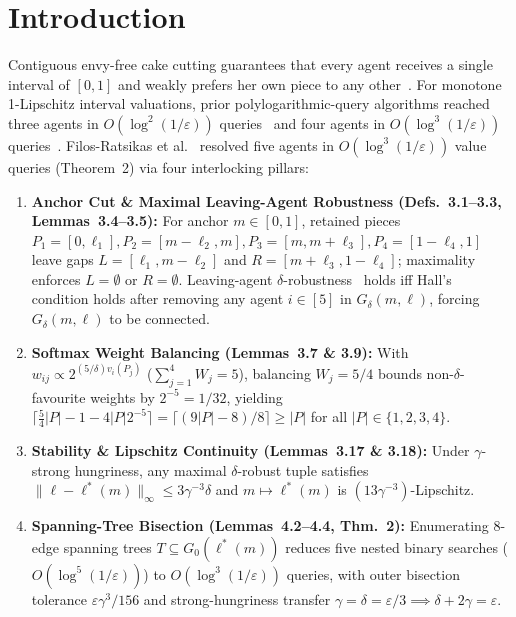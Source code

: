 \documentclass[10pt,twocolumn]{article}
\newcommand{\ellv}{\boldsymbol{\ell}}
\begin{document}
\section{Introduction}\label{sec:intro}
Contiguous envy-free cake cutting guarantees that every agent receives a single interval of $[0, 1]$ and weakly prefers her own piece to any other~\cite{stromquist1980cut,su1999rental}. For monotone 1-Lipschitz interval valuations, prior polylogarithmic-query algorithms reached three agents in $O(\log^2(1/\varepsilon))$ queries~\cite{deng2012algorithmic} and four agents in $O(\log^3(1/\varepsilon))$ queries~\cite{hollender2025envyfree4}. Filos-Ratsikas et al.~\cite{filosratsikas2026envyfree5} resolved five agents in $O(\log^3(1/\varepsilon))$ value queries (Theorem~2) via four interlocking pillars:
\begin{enumerate}[leftmargin=*,nosep]
  \item \textbf{Anchor Cut \& Maximal Leaving-Agent Robustness (Defs.~3.1--3.3, Lemmas~3.4--3.5):} For anchor $m \in [0,1]$, retained pieces $P_1 = [0,\ell_1], P_2 = [m-\ell_2, m], P_3 = [m, m+\ell_3], P_4 = [1-\ell_4, 1]$ leave gaps $L = [\ell_1, m-\ell_2]$ and $R = [m+\ell_3, 1-\ell_4]$; maximality enforces $L = \emptyset$ or $R = \emptyset$. Leaving-agent $\delta$-robustness~\cite{meunier2019multilabeled} holds iff Hall's condition holds after removing any agent $i \in [5]$ in $G_\delta(m, \ellv)$, forcing $G_\delta(m, \ellv)$ to be connected.
  \item \textbf{Softmax Weight Balancing (Lemmas~3.7 \& 3.9):} With $w_{ij} \propto 2^{(5/\delta)v_i(P_j)}$ ($\sum_{j=1}^4 W_j = 5$), balancing $W_j = 5/4$ bounds non-$\delta$-favourite weights by $2^{-5} = 1/32$, yielding $\lceil \frac{5}{4}|P| - 1 - 4|P|2^{-5}\rceil = \lceil (9|P|-8)/8\rceil \ge |P|$ for all $|P| \in \{1,2,3,4\}$.
  \item \textbf{Stability \& Lipschitz Continuity (Lemmas~3.17 \& 3.18):} Under $\gamma$-strong hungriness, any maximal $\delta$-robust tuple satisfies $\|\ellv - \ellv^*(m)\|_\infty \le 3\gamma^{-3}\delta$ and $m \mapsto \ellv^*(m)$ is $(13\gamma^{-3})$-Lipschitz.
  \item \textbf{Spanning-Tree Bisection (Lemmas~4.2--4.4, Thm.~2):} Enumerating 8-edge spanning trees $T \subseteq G_0(\ellv^*(m))$ reduces five nested binary searches ($O(\log^5(1/\varepsilon))$) to $O(\log^3(1/\varepsilon))$ queries, with outer bisection tolerance $\varepsilon\gamma^3/156$ and strong-hungriness transfer $\gamma = \delta = \varepsilon/3 \implies \delta + 2\gamma = \varepsilon$.
\end{enumerate}
\end{document}
